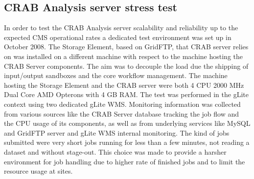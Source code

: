 \subsection{CRAB Analysis server stress test}
In order to test the CRAB Analysis server scalability and reliability up to
the expected CMS operational rates a dedicated test environment was
set up in October 2008. The Storage Element, based on GridFTP, 
that CRAB server relies on was installed on a different machine with 
respect to the machine hosting the CRAB Server components. The aim was 
to decouple the load
due the shipping of input/output sandboxes and the core workflow
management. The machine hosting the Storage Element and the CRAB
server were both 4 CPU 2000 MHz Dual Core AMD Opterons with 4 GB
RAM. The test was performed in the gLite context using two dedicated
gLite WMS. Monitoring information was collected from various sources
like the CRAB Server database tracking the job flow and the CPU usage
of its components, as well as from underlying services like MySQL and
GridFTP server and gLite WMS internal monitoring. The kind of
jobs submitted were very short jobs running for less than a few
minutes, not reading a dataset and without stage-out. This choice was
made to provide a harsher environment for job handling due to higher
rate of finished jobs and to limit the resource usage at sites.

%
%

